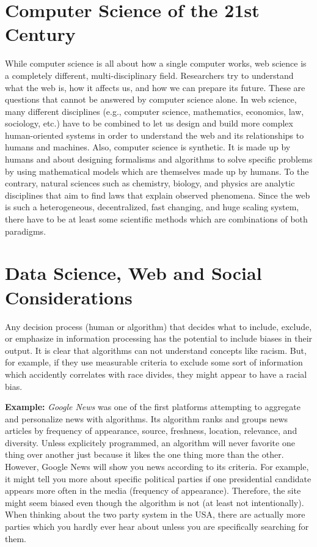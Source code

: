 \documentclass[a4paper]{article}
\begin{document}
\section{Computer Science of the 21st Century}
While computer science is all about how a single computer works, web science is a completely different, multi-disciplinary field.
Researchers try to understand what the web is, how it affects us, and how we can prepare its future.
These are questions that cannot be answered by computer science alone.
In web science, many different disciplines (e.g., computer science, mathematics, economics, law, sociology, etc.) have to be combined to let us design and build more complex human-oriented systems in order to understand the web and its relationships to humans and machines.
Also, computer science is synthetic.
It is made up by humans and about designing formalisms and algorithms to solve specific problems by using mathematical models which are themselves made up by humans.
To the contrary, natural sciences such as chemistry, biology, and physics are analytic disciplines that aim to find laws that explain observed phenomena.
Since the web is such a heterogeneous, decentralized, fast changing, and huge scaling system, there have to be at least some scientific methods which are combinations of both paradigms.

\section{Data Science, Web and Social Considerations}
Any decision process (human or algorithm) that decides what to include, exclude, or emphasize in information processing has the potential to include biases in their output.
It is clear that algorithms can not understand concepts like racism.
But, for example, if they use measurable criteria to exclude some sort of information which accidently correlates with race divides, they might appear to have a racial bias.

\textbf{Example:} \emph{Google News} was one of the first platforms attempting to aggregate and personalize news with algorithms.
Its algorithm ranks and groups news articles by frequency of appearance, source, freshness, location, relevance, and diversity.
Unless explicitely programmed, an algorithm will never favorite one thing over another just because it likes the one thing more than the other.
However, Google News will show you news according to its criteria.
For example, it might tell you more about specific political parties if one presidential candidate appears more often in the media (frequency of appearance).
Therefore, the site might seem biased even though the algorithm is not (at least not intentionally).
When thinking about the two party system in the USA, there are actually more parties which you hardly ever hear about unless you are specifically searching for them.
\end{document}
